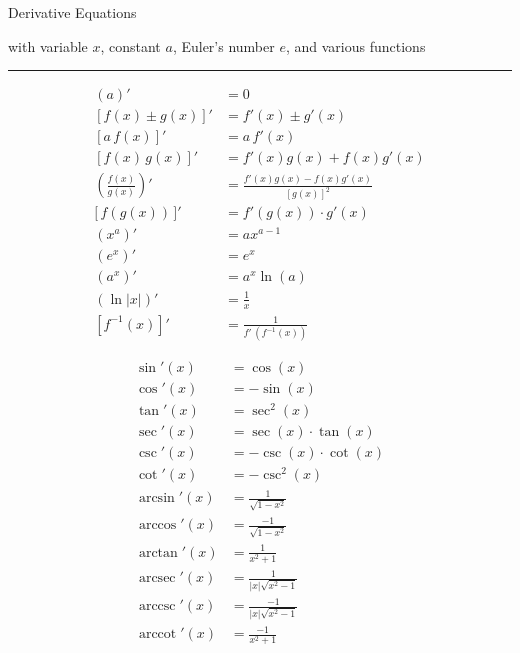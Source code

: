 \documentclass{article}
\DeclareMathOperator{\arcsec}{arcsec}
\DeclareMathOperator{\arccot}{arccot}
\DeclareMathOperator{\arccsc}{arccsc}
\begin{document}
\begin{center}
\fontsize{40}{12}\selectfont  \hspace{-15pt} 
{Derivative Equations}

\fontsize{15}{0}\selectfont \hspace{-10pt}
{{with variable $x$, constant $a$, Euler's number $e$, and various functions}}
\end{center}

\hrule

\fontsize{14}{0}\selectfont

\vfill

{\selectfont
\addtolength{\jot}{1.5em}
\begin{minipage}[t]{.45\textwidth}
\begin{centering}
\begin{align*}
(a)'&= 0\\
[f(x)\pm g(x)]' &= f'(x)\pm g'(x)\\
[a \,f(x)]' &= a \, f'(x)\\
[f(x)\, g(x)]' &= f'(x)g(x) + f(x)g'(x)\\
\left(\frac {f(x)}{g(x)}\right)' &= \frac{f'(x)g(x) - f(x)g'(x)}{[g(x)]^2}\\
\big[\,f(g(x))\,\big]' &= f'(g(x))\cdot g'(x)\\
(x^a)'&= ax^{a-1}\\
(e^{x})' &= e^x\\
(a^x)' &= a^x \ln(a)\\
(\ln|x|)' &= \frac{1}{x}\\
[f^{-1}(x)]' &= \frac{1}{f'\,(f^{-1}(x))}
\end{align*}
\end{centering}
\end{minipage}
\begin{minipage}[t]{.45\textwidth}
\begin{centering}
\begin{align*}
\sin'(x) &= \cos(x)\\
\cos'(x) &= -\sin(x)\\
\tan'(x) &= \sec^2(x)\\
\sec'(x) &= \sec(x)\cdot\tan(x)\\
\csc'(x) &= -\csc(x)\cdot\cot(x)\\
\cot'(x) &= -\csc^2(x)\\
\arcsin'(x) &= \frac{1}{\sqrt{1-x^2}}\\
\arccos'(x) &= \frac{-1}{\sqrt{1-x^2}}\\
\arctan'(x) &= \frac{1}{x^2+1}\\
\arcsec'(x) &= \frac{1}{|x|\sqrt{x^2-1}}\\
\arccsc'(x) &= \frac{-1}{|x|\sqrt{x^2-1}}\\
\arccot'(x) &= \frac{-1}{x^2+1}
\end{align*}
\end{centering}
\end{minipage}
}

\vfill
\end{document}
